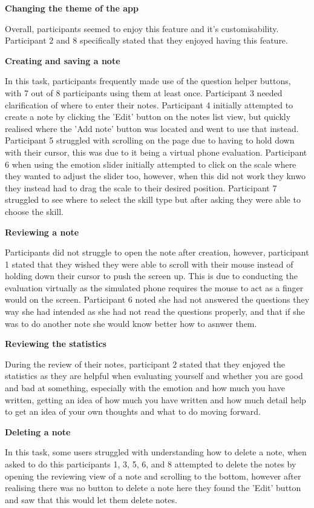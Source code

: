 \documentclass{l4proj}
\begin{document}
\textbf{Changing the theme of the app}

Overall, participants seemed to enjoy this feature and it's customisability. Participant 2 and 8 specifically stated that they enjoyed having this feature.

\textbf{Creating and saving a note}

In this task, participants frequently made use of the question helper buttons, with 7 out of 8 participants using them at least once. Participant 3 needed clarification of where to enter their notes. Participant 4 initially attempted to create a note by clicking the 'Edit' button on the notes list view, but quickly realised where the 'Add note' button was located and went to use that instead. Participant 5 struggled with scrolling on the page due to having to hold down with their cursor, this was due to it being a virtual phone evaluation. Participant 6 when using the emotion slider initially attempted to click on the scale where they wanted to adjust the slider too, however, when this did not work they knwo they instead had to drag the scale to their desired position. Participant 7 struggled to see where to select the skill type but after asking they were able to choose the skill.

\textbf{Reviewing a note}

Participants did not struggle to open the note after creation, however, participant 1 stated that they wished they were able to scroll with their mouse instead of holding down their cursor to push the screen up. This is due to conducting the evaluation virtually as the simulated phone requires the mouse to act as a finger would on the screen. Participant 6 noted she had not answered the questions they way she had intended as she had not read the questions properly, and that if she was to do another note she would know better how to asnwer them.

\textbf{Reviewing the statistics}

During the review of their notes, participant 2 stated that they enjoyed the statistics as they are helpful when evaluating yourself and whether you are good and bad at something, especially with the emotion and how much you have written, getting an idea of how much you have written and how much detail help to get an idea of your own thoughts and what to do moving forward.

\textbf{Deleting a note}
 
In this task, some users struggled with understanding how to delete a note, when asked to do this participants 1, 3, 5, 6, and 8 attempted to delete the notes by opening the reviewing view of a note and scrolling to the bottom, however after realising there was no button to delete a note here they found the 'Edit' button and saw that this would let them delete notes. 
\end{document}
